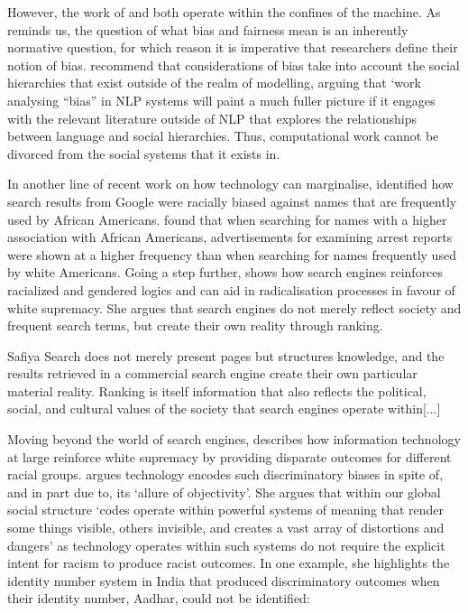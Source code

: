 However, the work of \citet{Kearns:2018} and \citet{Foulds:2019} both operate within the confines of the machine. As \citet{Blodgett:2020} reminds us, the question of what bias and fairness mean is an inherently normative question, for which reason it is imperative that researchers define their notion of bias.
\citet{Blodgett:2020} recommend that considerations of bias take into account the social hierarchies that exist outside of the realm of modelling, arguing that `work analysing ``bias'' in NLP systems will paint a much fuller picture if it engages with the relevant literature outside of NLP that explores the relationships between language and social hierarchies.
Thus, computational work cannot be divorced from the social systems that it exists in.

In another line of recent work on how technology can marginalise, \citet{Sweeney:2013} identified how search results from Google were racially biased against names that are frequently used by African Americans.
\citet{Sweeney:2013} found that when searching for names with a higher association with African Americans, advertisements for examining arrest reports were shown at a higher frequency than when searching for names frequently used by white Americans.
Going a step further, \citet{Noble:2018} shows how search engines reinforces racialized and gendered logics and can aid in radicalisation processes in favour of white supremacy.
She argues that search engines do not merely reflect society and frequent search terms, but create their own reality through ranking.

\begin{citequote}{Safiya \citet[p.148]{Noble:2018}}
  Search does not merely present pages but structures knowledge, and the results retrieved in a commercial search engine create their own particular material reality. Ranking is itself information that also reflects the political, social, and cultural values of the society that search engines operate within[...]
\end{citequote}

Moving beyond the world of search engines, \citet{Benjamin:2019} describes how information technology at large reinforce white supremacy by providing disparate outcomes for different racial groups.
\citet{Benjamin:2019} argues technology encodes such discriminatory biases in spite of, and in part due to, its `allure of objectivity'.
She argues that within our global social structure `codes operate within powerful systems of meaning that render some things visible, others invisible, and creates a vast array of distortions and dangers' as technology operates within such systems do not require the explicit intent for racism to produce racist outcomes.
In one example, she highlights the identity number system in India that produced discriminatory outcomes when their identity number, Aadhar, could not be identified:

